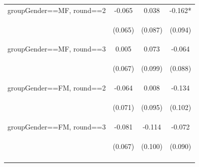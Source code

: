 \documentclass{article} %
\begin{document}
\begin{table}[H]
\begin{center}
\begin{tabular}{lccc}
groupGender==MF, round==2 & -0.065 & 0.038 & -0.162* \\
\vspace{4pt} & \begin{footnotesize}(0.065)\end{footnotesize} & \begin{footnotesize}(0.087)\end{footnotesize} & \begin{footnotesize}(0.094)\end{footnotesize} \\
groupGender==MF, round==3 & 0.005 & 0.073 & -0.064 \\
\vspace{4pt} & \begin{footnotesize}(0.067)\end{footnotesize} & \begin{footnotesize}(0.099)\end{footnotesize} & \begin{footnotesize}(0.088)\end{footnotesize} \\
groupGender==FM, round==2 & -0.064 & 0.008 & -0.134 \\
\vspace{4pt} & \begin{footnotesize}(0.071)\end{footnotesize} & \begin{footnotesize}(0.095)\end{footnotesize} & \begin{footnotesize}(0.102)\end{footnotesize} \\
groupGender==FM, round==3 & -0.081 & -0.114 & -0.072 \\
 & \begin{footnotesize}(0.067)\end{footnotesize} & \begin{footnotesize}(0.100)\end{footnotesize} & \begin{footnotesize}(0.090)\end{footnotesize} \\
\vspace{4pt} & \begin{footnotesize}\end{footnotesize} & \begin{footnotesize}\end{footnotesize} & \begin{footnotesize}\end{footnotesize} \\

\end{tabular}
\end{center}
\end{table}
\end{document}
